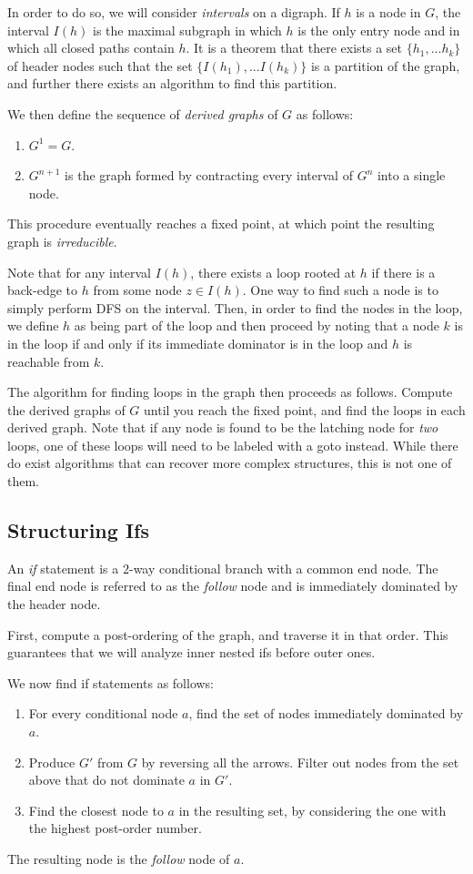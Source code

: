 \documentclass{article}
\begin{document}
In order to do so, we will consider {\em intervals} on a digraph. If $h$ is a node in $G$,
the interval $I(h)$ is the maximal subgraph in which $h$ is the only entry node and 
in which all closed paths contain $h$. It is a theorem that there exists a set 
$\{h_1, ... h_k\}$ of header nodes such that the set $\{ I(h_1), ... I(h_k) \}$ is
a partition of the graph, and further there exists an algorithm to find this partition.

We then define the sequence of {\em derived graphs} of $G$ as follows:
\begin{enumerate}
\item $G^1 = G$.
\item $G^{n+1}$ is the graph formed by contracting every interval of $G^n$ into a single node.
\end{enumerate}
This procedure eventually reaches a fixed point, at which point the resulting graph is
{\em irreducible}.

Note that for any interval $I(h)$, there exists a loop rooted at $h$ if there is a back-edge
to $h$ from some node $z \in I(h)$. One way to find such a node is to simply perform DFS
on the interval. Then, in order to find the nodes in the loop, we define $h$ as being part of
the loop and then proceed by noting that a node $k$ is in the loop if and only if its immediate
dominator is in the loop and $h$ is reachable from $k$.

The algorithm for finding loops in the graph then proceeds as follows.
Compute the derived graphs of $G$ until you reach the fixed point, and find the loops in each
derived graph. Note that if any node is found to be the latching node for {\em two} loops,
one of these loops will need to be labeled with a goto instead. While there do exist algorithms
that can recover more complex structures, this is not one of them.
\subsection{Structuring Ifs}
An {\em if} statement is a $2$-way conditional branch with a common end node. 
The final end node is referred to as the {\em follow} node and is immediately dominated
by the header node.

First, compute a post-ordering of the graph, and traverse it in that order. This guarantees
that we will analyze inner nested ifs before outer ones.

We now find if statements as follows:
\begin{enumerate}
\item For every conditional node $a$,
find the set of nodes immediately dominated by $a$.
\item Produce $G'$ from $G$ by
reversing all the arrows. Filter out nodes from the set above that do 
not dominate $a$ in $G'$.
\item Find the closest node to $a$ 
in the resulting set, by considering
the one with the highest post-order
number.
\end{enumerate}
The resulting node is the {\em follow} node of $a$.
\end{document}
